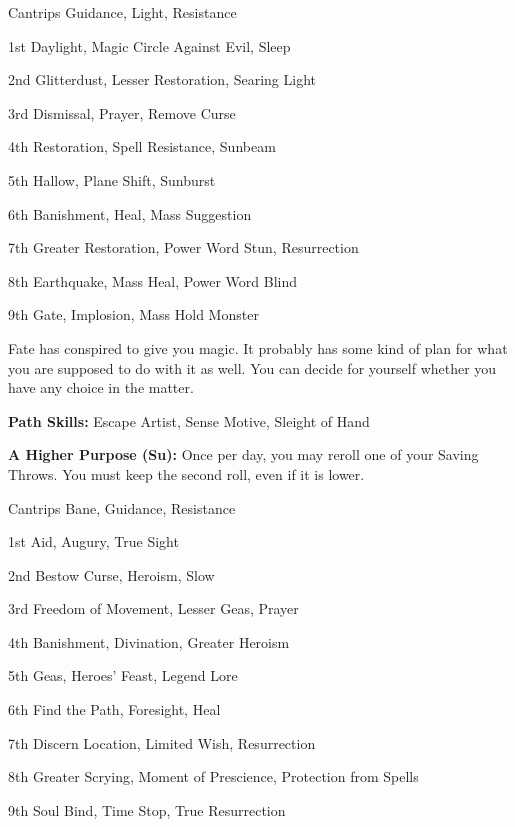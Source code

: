 \begin{description}
\begin{description*}
\item[Cantrips] Guidance, Light, Resistance
\item[1st] Daylight, Magic Circle Against Evil, Sleep
\item[2nd] Glitterdust, Lesser Restoration, Searing Light
\item[3rd] Dismissal, Prayer, Remove Curse
\item[4th] Restoration, Spell Resistance, Sunbeam
\item[5th] Hallow, Plane Shift, Sunburst
\item[6th] Banishment, Heal, Mass Suggestion
\item[7th] Greater Restoration, Power Word Stun, Resurrection
\item[8th] Earthquake, Mass Heal, Power Word Blind
\item[9th] Gate, Implosion, Mass Hold Monster
\end{description*}

\item[Destined Magic] Fate has conspired to give you magic. It probably has some kind of plan for what you are supposed to do with it as well. You can decide for yourself whether you have any choice in the matter.

\textbf{Path Skills:} Escape Artist, Sense Motive, Sleight of Hand

\textbf{A Higher Purpose (Su):} Once per day, you may reroll one of your Saving Throws. You must keep the second roll, even if it is lower.

\begin{description*}
\item[Cantrips] Bane, Guidance, Resistance
\item[1st] Aid, Augury, True Sight
\item[2nd] Bestow Curse, Heroism, Slow
\item[3rd] Freedom of Movement, Lesser Geas, Prayer
\item[4th] Banishment, Divination, Greater Heroism
\item[5th] Geas, Heroes' Feast, Legend Lore
\item[6th] Find the Path, Foresight, Heal
\item[7th] Discern Location, Limited Wish, Resurrection
\item[8th] Greater Scrying, Moment of Prescience, Protection from Spells
\item[9th] Soul Bind, Time Stop, True Resurrection
\end{description*}


\end{description}

